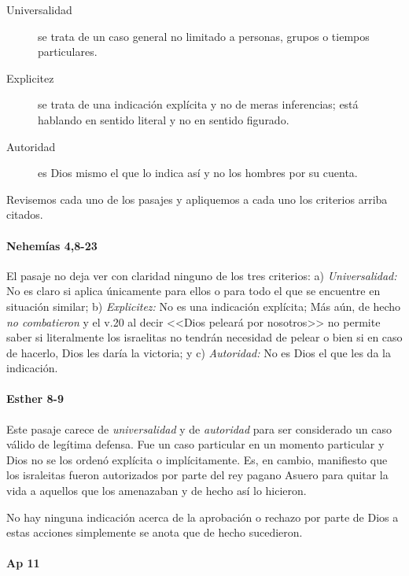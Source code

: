 \documentclass{article}
\begin{document}
\begin{description}
\item[Universalidad] se trata de un caso general no limitado a personas, grupos o tiempos particulares.
\item[Explicitez] se trata de una indicaci\'{o}n expl\'{i}cita y no de meras inferencias; est\'a hablando en sentido literal y no en sentido figurado.
\item[Autoridad] es Dios mismo el que lo indica as\'{i} y no los hombres por su cuenta.
\end{description}

\noindent
Revisemos cada uno de los pasajes y apliquemos a cada uno los criterios arriba citados.

\paragraph{Nehem\'{i}as 4,8-23}

El pasaje no deja ver con claridad ninguno de los tres criterios: a) \emph{Universalidad:} No es claro si aplica \'unicamente para ellos o para todo el que se encuentre en situaci\'on similar; b) \emph{Explicitez:} No es una indicaci\'on expl\'{i}cita; M\'as a\'un, de hecho \emph{no combatieron} y el v.20 al decir <<Dios pelear\'a por nosotros>> no permite saber si literalmente los israelitas no tendr\'an necesidad de pelear o bien si en caso de hacerlo, Dios les dar\'{i}a la victoria; y c) \emph{Autoridad:} No es Dios el que les da la indicaci\'on.

\paragraph{Esther 8-9}

Este pasaje carece de \emph{universalidad} y de \emph{autoridad} para ser considerado un caso v\'alido de leg\'{i}tima defensa. Fue un caso particular en un momento particular y Dios no se los orden\'o expl\'{i}cita o impl\'{i}citamente. Es, en cambio, manifiesto que los israleitas fueron autorizados por parte del rey pagano Asuero para quitar la vida a aquellos que los amenazaban y de hecho as\'{i} lo hicieron.

No hay ninguna indicaci\'on acerca de la aprobaci\'on o rechazo por parte de Dios a estas acciones simplemente se anota que de hecho sucedieron.

\paragraph{Ap 11}
\end{document}
